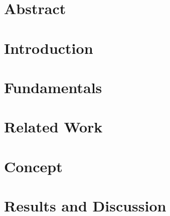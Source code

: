\documentclass[oneside,11pt,a4paper,twoside]{scrreprt}
\begin{document}
\chapter*{Abstract}
\thispagestyle{empty}

\cleardoublepage
\setcounter{page}{1}
\pagestyle{headings}
\renewcommand{\baselinestretch}{1.3}
\small\normalsize
\tableofcontents
\renewcommand{\baselinestretch}{1}
\small\normalsize
\cleardoublepage
\setcounter{page}{1}
\chapter{Introduction}\label{sec:introduction}
  

  \cleardoublepage
\chapter{Fundamentals}\label{sec:fundamentals}
  
  \cleardoublepage
\chapter{Related Work}\label{sec:relatedwork}
  
  \cleardoublepage
\chapter{Concept}\label{sec:concept}
  
  \cleardoublepage
\chapter{Results and Discussion}\label{sec:resultsanddiscussion}
  
  \cleardoublepage
\end{document}
